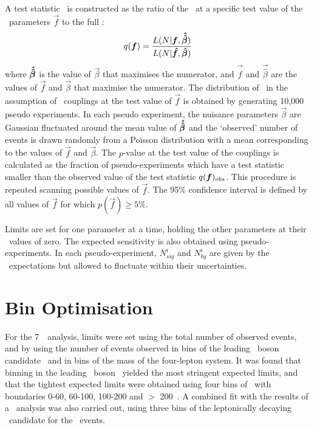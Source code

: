 A test statistic \teststat\ is constructed as the ratio of the \maxprofilellh\
at a specific test value of the \TGC\ parameters $\vec{f}$ to the full \maxprofilellh:
\begin{equation}
q(\boldsymbol{f}) =
\frac{L(N|\boldsymbol{f},\boldsymbol{\hat{\hat{\beta}}})}{L(N|\boldsymbol{\hat{f}},\boldsymbol{\hat{\beta}})}
\end{equation}
where $\boldsymbol{\hat{\hat{\beta}}}$ is the value of $\vec{\beta}$ that maximises the
numerator, and $\vec{\hat{f}}$ and $\vec{\hat{\beta}}$ are the values of
$\vec{f}$ and $\vec{\beta}$ that maximise the numerator. The distribution of
\teststat\ in the assumption of \TGC\ couplings at the test value of $\vec{f}$
is obtained by generating 10,000 pseudo experiments. In each
pseudo experiment, the nuisance parameters $\vec{\beta}$ are Gaussian
fluctuated around the mean value of $\boldsymbol{\hat{\hat{\beta}}}$ and the `observed' number of events
is drawn randomly from a Poisson distribution with a mean corresponding to the
values of $\vec{f}$ and $\vec{\beta}$. The $p$-value at the test value of the
couplings is calculated as the fraction of pseudo-experiments which have a test
statistic smaller than the observed value of the test statistic $q(\boldsymbol{f})_{obs}$.
This procedure is repeated scanning possible values of $\vec{f}$. The 95\%
confidence interval is defined by all values of $\vec{f}$ for which
$p(\vec{f})\geq 5\%$. 

Limits are set for one parameter at a time, holding the other parameters at
their \sm\ values of zero. The expected sensitivity is also obtained using
pseudo-experiments. In each pseudo-experiment, $N^{i}_{sig}$ and $N^{i}_{bg}$
are given by the \sm\ expectations but allowed to fluctuate within their
uncertainties.

\section{Bin Optimisation}

For the 7~\tev\ analysis, limits were set using the total number of observed
events, and by using the number of events observed in bins of the leading \Z\
boson candidate \pt\ and in bins of the mass of the four-lepton system. It was found that
binning in the leading \Z\ boson \pt\ yielded the most stringent expected limits, and
that the tightest expected limits were obtained using four bins of \pt\ with boundaries 0-60,
60-100, 100-200 and $>$ 200~\GeV. A combined fit with the results of a \ZZllvv\
analysis was also carried out, using three bins of the leptonically decaying \Z\
candidate for the \ZZllvv\ events.

